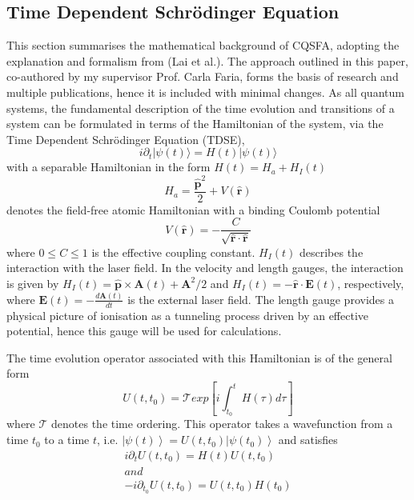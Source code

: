 \documentclass[11pt]{article}
\numberwithin{equation}{section}
\begin{document}
\subsection{Time Dependent Schrödinger Equation}
This section summarises the mathematical background of CQSFA, adopting the explanation and formalism from (Lai et al.)\cite{lai_2015_influence}. The approach outlined in this paper, co-authored by my supervisor Prof. Carla Faria, forms the basis of research and multiple publications, hence it is included with minimal changes.
As all quantum systems, the fundamental description of the time evolution and transitions of a system can be formulated in terms of the Hamiltonian of the system, via the Time Dependent Schrödinger Equation (TDSE), 
\begin{equation}
    i\partial_t|\psi(t)\rangle = H(t)|\psi(t) \rangle 
\end{equation}
with a separable Hamiltonian in the form $H(t) = H_a + H_I(t)$
\begin{equation}
    H_a = \frac{\hat{\textbf{p}}^2}{2} + V(\hat{\textbf{r}})
\end{equation}
denotes the field-free atomic Hamiltonian with a binding Coulomb potential
\begin{equation}\label{eq:potential}
    V(\hat{\textbf{r}}) = -\frac{C}{\sqrt{\hat{\textbf{r}}\cdot\hat{\textbf{r}}}}
\end{equation}
where $0 \leq C \leq 1$ is the effective coupling constant. $H_I(t)$ describes the interaction with the laser field. In the velocity and length gauges, the interaction is given by $H_I(t) = \mathbf{\hat{p}} \times \mathbf{A}(t) + \mathbf{A}^2/2$ and $H_I(t) = - \hat{\textbf{r}}\cdot\textbf{E}(t)$, respectively,
where $\textbf{E}(t) = -\frac{d\mathbf{A}(t)}{dt}$ is the external laser field. The length gauge provides a physical picture of ionisation as a tunneling process driven by an effective potential, hence this gauge will be used for calculations.
\par
The time evolution operator associated with this Hamiltonian is of the general form
$$U(t,t_0) = \mathcal{T} exp \left [ i \int_{t_0}^t H(\tau) d\tau \right ]$$
where $\mathcal{T}$ denotes the time ordering. This operator takes a wavefunction from a time $t_0$ to a time $t$, i.e. $\left |\psi(t) \right \rangle = U(t, t_0) \left |\psi(t_0) \right \rangle$ and satisfies
\begin{equation}
    \begin{gathered}
        i\partial_t U(t,t_0) = H(t)U(t,t_0) \\
        and \\
        -i\partial_{t_0}U(t,t_0) = U(t,t_0)H(t_0)
    \end{gathered}
\end{equation}
\end{document}
